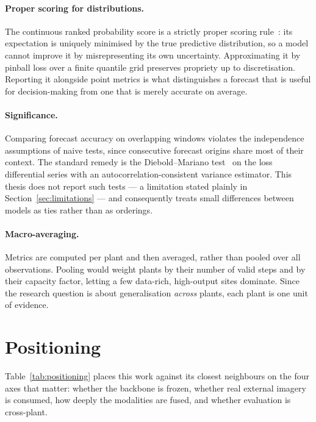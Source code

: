 \paragraph{Proper scoring for distributions.} The continuous ranked probability score is a
strictly proper scoring rule~\cite{gneiting}: its expectation is uniquely minimised by the
true predictive distribution, so a model cannot improve it by misrepresenting its own
uncertainty. Approximating it by pinball loss over a finite quantile grid preserves
propriety up to discretisation. Reporting it alongside point metrics is what distinguishes a
forecast that is useful for decision-making from one that is merely accurate on average.

\paragraph{Significance.} Comparing forecast accuracy on overlapping windows violates the
independence assumptions of naive tests, since consecutive forecast origins share most of
their context. The standard remedy is the Diebold--Mariano test~\cite{diebold} on the loss
differential series with an autocorrelation-consistent variance estimator. This thesis does
not report such tests --- a limitation stated plainly in Section~\ref{sec:limitations} --- and
consequently treats small differences between models as ties rather than as orderings.

\paragraph{Macro-averaging.} Metrics are computed per plant and then averaged, rather than
pooled over all observations. Pooling would weight plants by their number of valid steps and
by their capacity factor, letting a few data-rich, high-output sites dominate. Since the
research question is about generalisation \emph{across} plants, each plant is one unit of
evidence.

\section{Positioning}
\label{sec:positioning}

Table~\ref{tab:positioning} places this work against its closest neighbours on the four axes
that matter: whether the backbone is frozen, whether real external imagery is consumed, how
deeply the modalities are fused, and whether evaluation is cross-plant.

